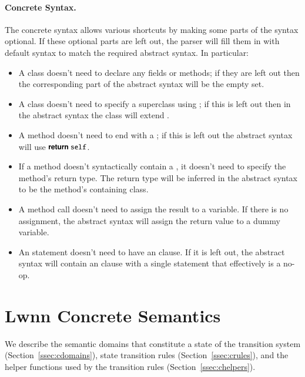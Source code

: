 \documentclass[10pt]{article}
\begin{document}
\paragraph{Concrete Syntax.} The concrete syntax allows various
shortcuts by making some parts of the syntax optional. If these
optional parts are left out, the parser will fill them in with default
syntax to match the required abstract syntax. In particular:

\begin{itemize}
\item A class doesn't need to declare any fields or methods; if they
  are left out then the corresponding part of the abstract syntax will
  be the empty set.

\item A class doesn't need to specify a superclass using ;
  if this is left out then in the abstract syntax the class will
  extend \TopClass.

\item A method doesn't need to end with a ; if this is left
  out the abstract syntax will use $\mbox{\sffamily{\bfseries\small {return }}}\mbox{\small \texttt{self}}$.

\item If a method doesn't syntactically contain a , it
  doesn't need to specify the method's return type. The return type
  will be inferred in the abstract syntax to be the method's
  containing class.

\item A method call doesn't need to assign the result to a
  variable. If there is no assignment, the abstract syntax will assign
  the return value to a dummy variable.

\item An  statement doesn't need to have an 
  clause. If it is left out, the abstract syntax will contain an
   clause with a single statement that effectively is a
  no-op.
\end{itemize}

\pagebreak

\section{Lwnn Concrete Semantics}

We describe the semantic domains that constitute a state of the
transition system (Section~\ref{ssec:cdomains}), state transition
rules (Section~\ref{ssec:crules}), and the helper functions used by
the transition rules (Section~\ref{ssec:chelpers}).
\end{document}
